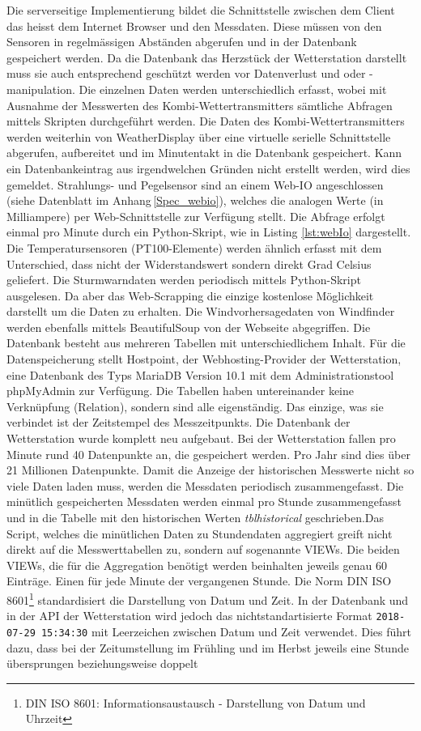 \documentclass[11pt]{article}
\begin{document}
\begin{multicols}{2}

Die serverseitige Implementierung bildet die Schnittstelle zwischen dem Client das heisst dem Internet Browser und den Messdaten. Diese müssen von den Sensoren in regelmässigen Abständen abgerufen und in der Datenbank gespeichert werden. Da die Datenbank das Herzstück der Wetterstation darstellt muss sie auch entsprechend geschützt werden vor Datenverlust und oder -manipulation. Die einzelnen Daten werden unterschiedlich erfasst, wobei mit Ausnahme der Messwerten des Kombi-Wettertransmitters sämtliche Abfragen mittels Skripten durchgeführt werden. Die Daten des Kombi-Wettertransmitters werden weiterhin von WeatherDisplay über eine virtuelle serielle Schnittstelle abgerufen, aufbereitet und im Minutentakt in die Datenbank gespeichert. Kann ein Datenbankeintrag aus irgendwelchen Gründen nicht erstellt werden, wird dies gemeldet.  Strahlungs- und Pegelsensor sind an einem Web-IO angeschlossen (siehe Datenblatt im Anhang\,\ref{Spec_webio}), welches die analogen Werte (in Milliampere) per Web-Schnittstelle zur Verfügung stellt. Die Abfrage erfolgt einmal pro Minute durch ein Python-Skript, wie in Listing \ref{lst:webIo} dargestellt. Die Temperatursensoren (PT100-Elemente) werden ähnlich erfasst mit dem Unterschied, dass nicht der Widerstandswert sondern direkt Grad Celsius geliefert. Die Sturmwarndaten werden periodisch mittels Python-Skript ausgelesen. Da aber das Web-Scrapping die einzige kostenlose Möglichkeit darstellt um die Daten zu erhalten. Die Windvorhersagedaten von Windfinder werden ebenfalls mittels BeautifulSoup von der Webseite abgegriffen. Die Datenbank besteht aus mehreren Tabellen mit unterschiedlichem Inhalt. Für die Datenspeicherung stellt Hostpoint, der Webhosting-Provider der Wetterstation, eine Datenbank des Typs MariaDB Version 10.1 mit dem Administrationstool phpMyAdmin zur Verfügung. Die Tabellen haben untereinander keine Verknüpfung (Relation), sondern sind alle eigenständig. Das einzige, was sie verbindet ist der Zeitstempel des Messzeitpunkts. Die Datenbank der Wetterstation wurde komplett neu aufgebaut. Bei der Wetterstation fallen pro Minute rund 40 Datenpunkte an, die gespeichert werden. Pro Jahr sind dies über 21 Millionen Datenpunkte. Damit die Anzeige der historischen Messwerte nicht so viele Daten laden muss, werden die Messdaten periodisch zusammengefasst. Die minütlich gespeicherten Messdaten werden einmal pro Stunde zusammengefasst und in die Tabelle mit den historischen Werten \emph{tblhistorical} geschrieben.Das Script, welches die minütlichen Daten zu Stundendaten aggregiert greift nicht direkt auf die Messwerttabellen zu, sondern auf sogenannte VIEWs. Die beiden VIEWs, die für die Aggregation benötigt werden beinhalten jeweils genau 60 Einträge. Einen für jede Minute der vergangenen Stunde. Die Norm DIN ISO 8601\footnote{DIN ISO 8601: Informationsaustausch - Darstellung von Datum und Uhrzeit} standardisiert die Darstellung von Datum und Zeit. In der Datenbank und in der API der Wetterstation wird jedoch das nichtstandartisierte Format \texttt{2018-07-29 15:34:30} mit Leerzeichen zwischen Datum und Zeit verwendet. Dies führt dazu, dass bei der Zeitumstellung im Frühling und im Herbst jeweils eine Stunde übersprungen beziehungsweise doppelt 
\end{multicols}
\end{document}
